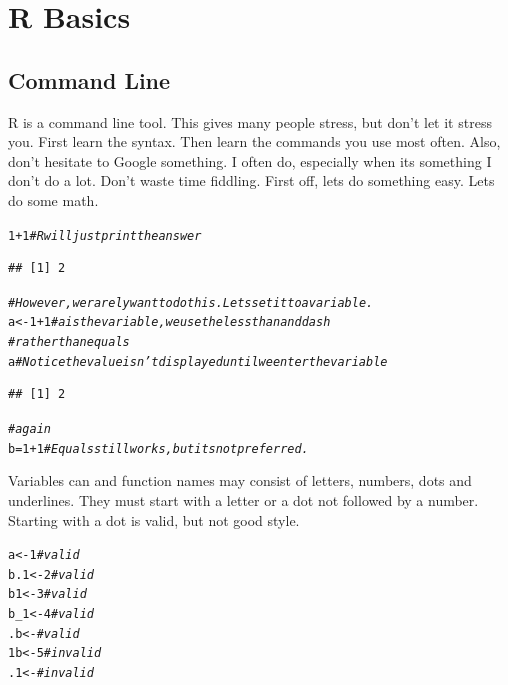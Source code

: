 \documentclass{article}\usepackage[]{graphicx}\usepackage[]{color}
\makeatletter
\newcommand{\hlnum}[1]{\textcolor[rgb]{0.686,0.059,0.569}{#1}}%
\newcommand{\hlcom}[1]{\textcolor[rgb]{0.678,0.584,0.686}{\textit{#1}}}%
\newcommand{\hlopt}[1]{\textcolor[rgb]{0,0,0}{#1}}%
\newcommand{\hlstd}[1]{\textcolor[rgb]{0.345,0.345,0.345}{#1}}%
\newcommand{\hlkwb}[1]{\textcolor[rgb]{0.69,0.353,0.396}{#1}}%
\newenvironment{kframe}{%
 \def\at@end@of@kframe{}%
 \ifinner\ifhmode%
  \def\at@end@of@kframe{\end{minipage}}%
  \begin{minipage}{\columnwidth}%
 \fi\fi%
 \def\FrameCommand##1{\hskip\@totalleftmargin \hskip-\fboxsep
 \colorbox{shadecolor}{##1}\hskip-\fboxsep
     \hskip-\linewidth \hskip-\@totalleftmargin \hskip\columnwidth}%
 \MakeFramed {\advance\hsize-\width
   \@totalleftmargin\z@ \linewidth\hsize
   \@setminipage}}%
 {\par\unskip\endMakeFramed%
 \at@end@of@kframe}
\newenvironment{knitrout}{}{} %
\makeatother
\begin{document}
  \section*{R Basics}
  
  \subsection*{Command Line}
    R is a command line tool. This gives many people stress, but don't let it stress you. First learn the syntax. Then learn the commands you use most often. Also, don't hesitate to Google something. I often do, especially when its something I don't do a lot. Don't waste time fiddling. 
    First off, lets do something easy. Lets do some math.
    
\begin{knitrout}
\color{fgcolor}\begin{kframe}
\begin{alltt}
\hlnum{1} \hlopt{+} \hlnum{1}  \hlcom{# R will just print the answer}
\end{alltt}
\begin{verbatim}
## [1] 2
\end{verbatim}
\begin{alltt}
\hlcom{# However, we rarely want to do this. Lets set it to a variable.}
\hlstd{a} \hlkwb{<-} \hlnum{1} \hlopt{+} \hlnum{1}  \hlcom{# a is the variable, we use the less than and dash }
            \hlcom{# rather than equals}
\hlstd{a} \hlcom{# Notice the value isn't displayed until we enter the variable}
\end{alltt}
\begin{verbatim}
## [1] 2
\end{verbatim}
\begin{alltt}
  \hlcom{# again}
\hlstd{b} \hlkwb{=} \hlnum{1} \hlopt{+} \hlnum{1} \hlcom{# Equals still works, but its not preferred. }
\end{alltt}
\end{kframe}
\end{knitrout}
    
    Variables can and function names may consist of letters, numbers, dots and underlines. They must start with a letter or a dot not followed by a number. Starting with a dot is valid, but not good style.
    
\begin{knitrout}
\color{fgcolor}\begin{kframe}
\begin{alltt}
a <- 1  \hlcom{# valid}
b.1 <- 2 \hlcom{# valid}
b1 <- 3 \hlcom{# valid}
b_1 <- 4 \hlcom{# valid }
.b <- \hlcom{# valid}
1b <- 5 \hlcom{# invalid}
.1 <- \hlcom{# invalid}
\end{alltt}
\end{kframe}
\end{knitrout}
    
\end{document}
